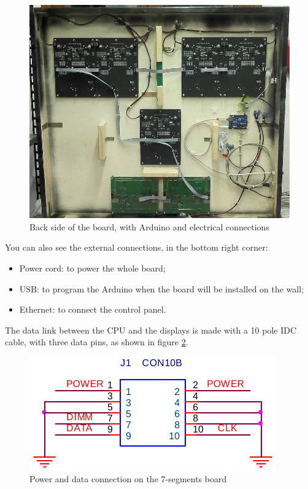 \documentclass[11pt,english]{article}
\begin{document}
%
\begin{figure}[htb]
\centering\includegraphics[scale=0.42]{img/Board-back}

\caption{Back side of the board, with Arduino and electrical connections \label{fig:board-back}}

\end{figure}

You can also see the external connections, in the bottom right corner:

\begin{itemize}
 \item Power cord: to power the whole board;
 \item USB: to program the Arduino when the board will be installed on the wall;
 \item Ethernet: to connect the control panel.
\end{itemize}

The data link between the CPU and the displays is made with a 10 pole IDC cable, with three data pins, 
as shown in figure \ref{fig:j1}. 

%
\begin{figure}[htb]
\centering\includegraphics[scale=0.45]{img/J1-con}

\caption{Power and data connection on the 7-segments board \label{fig:j1}}

\end{figure}
\end{document}
